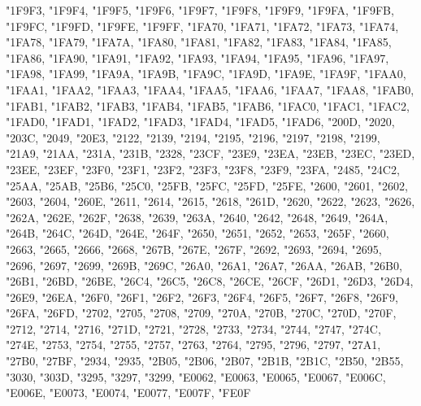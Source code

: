 {	"1F9F3,
	"1F9F4,
	"1F9F5,
	"1F9F6,
	"1F9F7,
	"1F9F8,
	"1F9F9,
	"1F9FA,
	"1F9FB,
	"1F9FC,
	"1F9FD,
	"1F9FE,
	"1F9FF,
	"1FA70,
	"1FA71,
	"1FA72,
	"1FA73,
	"1FA74,
	"1FA78,
	"1FA79,
	"1FA7A,
	"1FA80,
	"1FA81,
	"1FA82,
	"1FA83,
	"1FA84,
	"1FA85,
	"1FA86,
	"1FA90,
	"1FA91,
	"1FA92,
	"1FA93,
	"1FA94,
	"1FA95,
	"1FA96,
	"1FA97,
	"1FA98,
	"1FA99,
	"1FA9A,
	"1FA9B,
	"1FA9C,
	"1FA9D,
	"1FA9E,
	"1FA9F,
	"1FAA0,
	"1FAA1,
	"1FAA2,
	"1FAA3,
	"1FAA4,
	"1FAA5,
	"1FAA6,
	"1FAA7,
	"1FAA8,
	"1FAB0,
	"1FAB1,
	"1FAB2,
	"1FAB3,
	"1FAB4,
	"1FAB5,
	"1FAB6,
	"1FAC0,
	"1FAC1,
	"1FAC2,
	"1FAD0,
	"1FAD1,
	"1FAD2,
	"1FAD3,
	"1FAD4,
	"1FAD5,
	"1FAD6,
	"200D,
	"2020,
	"203C,
	"2049,
	"20E3,
	"2122,
	"2139,
	"2194,
	"2195,
	"2196,
	"2197,
	"2198,
	"2199,
	"21A9,
	"21AA,
	"231A,
	"231B,
	"2328,
	"23CF,
	"23E9,
	"23EA,
	"23EB,
	"23EC,
	"23ED,
	"23EE,
	"23EF,
	"23F0,
	"23F1,
	"23F2,
	"23F3,
	"23F8,
	"23F9,
	"23FA,
	"2485,
	"24C2,
	"25AA,
	"25AB,
	"25B6,
	"25C0,
	"25FB,
	"25FC,
	"25FD,
	"25FE,
	"2600,
	"2601,
	"2602,
	"2603,
	"2604,
	"260E,
	"2611,
	"2614,
	"2615,
	"2618,
	"261D,
	"2620,
	"2622,
	"2623,
	"2626,
	"262A,
	"262E,
	"262F,
	"2638,
	"2639,
	"263A,
	"2640,
	"2642,
	"2648,
	"2649,
	"264A,
	"264B,
	"264C,
	"264D,
	"264E,
	"264F,
	"2650,
	"2651,
	"2652,
	"2653,
	"265F,
	"2660,
	"2663,
	"2665,
	"2666,
	"2668,
	"267B,
	"267E,
	"267F,
	"2692,
	"2693,
	"2694,
	"2695,
	"2696,
	"2697,
	"2699,
	"269B,
	"269C,
	"26A0,
	"26A1,
	"26A7,
	"26AA,
	"26AB,
	"26B0,
	"26B1,
	"26BD,
	"26BE,
	"26C4,
	"26C5,
	"26C8,
	"26CE,
	"26CF,
	"26D1,
	"26D3,
	"26D4,
	"26E9,
	"26EA,
	"26F0,
	"26F1,
	"26F2,
	"26F3,
	"26F4,
	"26F5,
	"26F7,
	"26F8,
	"26F9,
	"26FA,
	"26FD,
	"2702,
	"2705,
	"2708,
	"2709,
	"270A,
	"270B,
	"270C,
	"270D,
	"270F,
	"2712,
	"2714,
	"2716,
	"271D,
	"2721,
	"2728,
	"2733,
	"2734,
	"2744,
	"2747,
	"274C,
	"274E,
	"2753,
	"2754,
	"2755,
	"2757,
	"2763,
	"2764,
	"2795,
	"2796,
	"2797,
	"27A1,
	"27B0,
	"27BF,
	"2934,
	"2935,
	"2B05,
	"2B06,
	"2B07,
	"2B1B,
	"2B1C,
	"2B50,
	"2B55,
	"3030,
	"303D,
	"3295,
	"3297,
	"3299,
	"E0062,
	"E0063,
	"E0065,
	"E0067,
	"E006C,
	"E006E,
	"E0073,
	"E0074,
	"E0077,
	"E007F,
	"FE0F}

